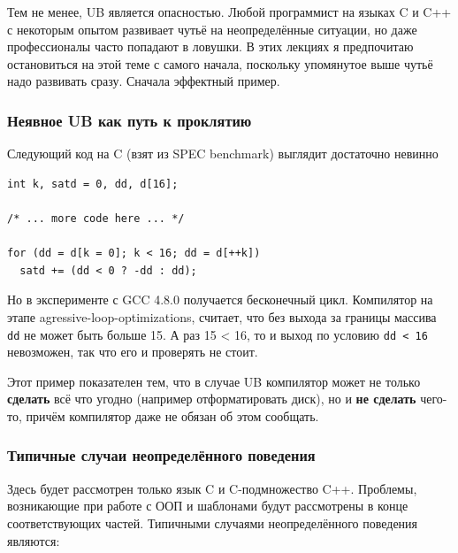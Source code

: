 \documentclass[a4paper,12pt,oneside]{article}
\begin{document}
Тем не менее, UB является опасностью. Любой программист на языках C и C++ с некоторым опытом развивает чутьё на неопределённые ситуации, но даже профессионалы часто попадают в ловушки. В этих лекциях я предпочитаю остановиться на этой теме с самого начала, поскольку упомянутое выше чутьё надо развивать сразу. Сначала эффектный пример.

\subsubsection{Неявное UB как путь к проклятию}\label{HiddenUB}

Следующий код на C (взят из SPEC benchmark) выглядит достаточно невинно

\begin{lstlisting}
int k, satd = 0, dd, d[16];

/* ... more code here ... */

for (dd = d[k = 0]; k < 16; dd = d[++k])
  satd += (dd < 0 ? -dd : dd);
\end{lstlisting}

Но в эксперименте с GCC 4.8.0 получается бесконечный цикл. Компилятор на этапе agressive-loop-optimizations, считает, что без выхода за границы массива \lstinline!dd! не может быть больше 15. А раз 15 < 16, то и выход по условию \lstinline!dd < 16! невозможен, так что его и проверять не стоит.

Этот пример показателен тем, что в случае UB компилятор может не только \textbf{сделать} всё что угодно (например отформатировать диск), но и \textbf{не сделать} чего-то, причём компилятор даже не обязан об этом сообщать.

\subsubsection{Типичные случаи неопределённого поведения}\label{TypicalUB}

Здесь будет рассмотрен только язык C и C-подмножество C++. Проблемы, возникающие при работе с ООП и шаблонами будут рассмотрены в конце соответствующих частей. Типичными случаями неопределённого поведения являются:
\end{document}
